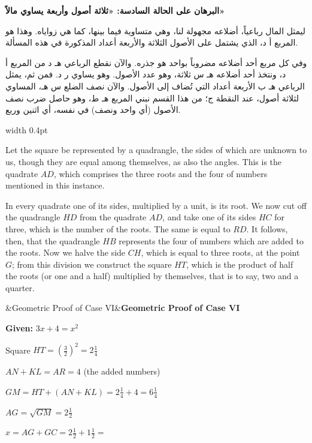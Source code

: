 \documentclass[11pt,a4paper,openany,oneside]{book}
\newenvironment{mathbox}[1][]{%
  \smallskip\par\noindent
  \begin{lrbox}{\mathboxsave}
  \begin{minipage}{\dimexpr\linewidth-2\fboxsep-2\fboxrule\relax}%
  \setlength{\parskip}{0.3em}%
  \ifx&#1&\else\textbf{#1}\\[0.2cm]\fi
}{%
  \end{minipage}%
  \end{lrbox}
  \fcolorbox{sectioncolor}{mathbg}{\usebox{\mathboxsave}}%
  \smallskip}
\begin{document}
\noindent\begin{minipage}[t]{0.48\textwidth}
\raggedleft

\begin{Arabic}
\textbf{البرهان على الحالة السادسة: «ثلاثة أصول وأربعة يساوي مالاً»}

ليمثل المال رباعياً، أضلاعه مجهولة لنا، وهي متساوية فيما بينها، كما هي زواياه. وهذا هو المربع أ د، الذي يشتمل على الأصول الثلاثة والأربعة أعداد المذكورة في هذه المسألة.

وفي كل مربع أحد أضلاعه مضروباً بواحد هو جذره. والآن نقطع الرباعي هـ د من المربع أ د، ونتخذ أحد أضلاعه هـ س ثلاثة، وهو عدد الأصول. وهو يساوي ر د. فمن ثم، يمثل الرباعي هـ ب الأربعة أعداد التي تُضاف إلى الأصول. والآن نصف الضلع س هـ، المساوي لثلاثة أصول، عند النقطة ج؛ من هذا القسم نبني المربع هـ ط، وهو حاصل ضرب نصف الأصول (أي واحد ونصف) في نفسه، أي اثنين وربع.
\end{Arabic}

\end{minipage}%
\hfill\vrule width 0.4pt\hfill
\begin{minipage}[t]{0.48\textwidth}
\raggedright

Let the square be represented by a quadrangle, the sides of which are unknown to us, though they are equal among themselves, as also the angles. This is the quadrate $AD$, which comprises the three roots and the four of numbers mentioned in this instance.

In every quadrate one of its sides, multiplied by a unit, is its root. We now cut off the quadrangle $HD$ from the quadrate $AD$, and take one of its sides $HC$ for three, which is the number of the roots. The same is equal to $RD$. It follows, then, that the quadrangle $HB$ represents the four of numbers which are added to the roots. Now we halve the side $CH$, which is equal to three roots, at the point $G$; from this division we construct the square $HT$, which is the product of half the roots (or one and a half) multiplied by themselves, that is to say, two and a quarter.

\end{minipage}
\vspace{0.3cm}

\begin{mathbox}[Geometric Proof of Case VI]
\begin{center}
\textbf{Given:} $3x + 4 = x^2$

\vspace{0.2cm}

Square $HT = \left(\frac{3}{2}\right)^2 = 2\tfrac{1}{4}$

$AN + KL = AR = 4$ (the added numbers)

$GM = HT + (AN + KL) = 2\tfrac{1}{4} + 4 = 6\tfrac{1}{4}$

$AG = \sqrt{GM} = 2\tfrac{1}{2}$

$x = AG + GC = 2\tfrac{1}{2} + 1\tfrac{1}{2} =$ 
\end{center}
\end{mathbox}
\end{document}
